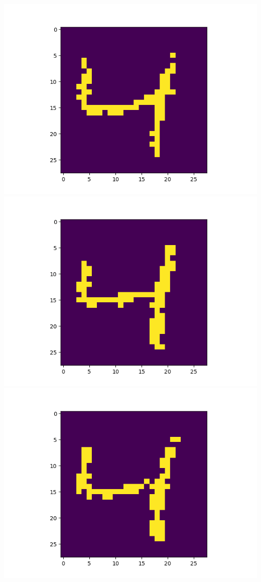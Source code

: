 \includegraphics[scale=0.2]{./bilder/comparison/prob/28}
\includegraphics[scale=0.2]{./bilder/comparison/prob/29}
\includegraphics[scale=0.2]{./bilder/comparison/prob/30}
